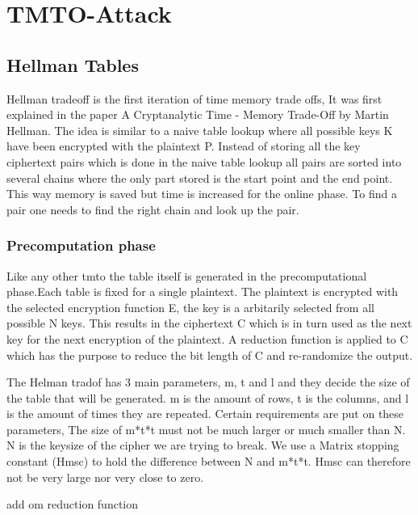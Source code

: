 \chapter{TMTO-Attack}

\label{ch:tmto}

\newpage
\section{Hellman Tables}
\label{sec:hmtheory}
Hellman tradeoff is the first iteration of time memory trade offs, It was first explained in the paper A Cryptanalytic Time - Memory Trade-Off by Martin Hellman.
The idea is similar to a naive table lookup where all possible keys K have been encrypted with the plaintext P. Instead of storing all the key ciphertext pairs which is done in the naive table lookup all pairs are sorted into several chains where the only part stored is the start point and the end point. This way memory is saved but time is increased for the online phase. To find a pair one needs to find the right chain and look up the pair.


\subsection*{Precomputation phase} %
Like any other tmto the table itself is generated in the precomputational phase.Each table is fixed for a single plaintext. The plaintext is encrypted with the selected encryption function E, the key is a arbitarily selected from all possible N keys. This results in the ciphertext C which is in turn used as the next key for the next encryption of the plaintext. A reduction function is applied to C which has the purpose to reduce the bit length of C and re-randomize the output.

The Helman tradof has 3 main parameters, m, t and l and they decide the size of the table that will be generated.
m is the amount of rows, t is the columns, and l is the amount of times they are repeated.
Certain requirements are put on these parameters, The size of m*t*t must not be much larger or much smaller than N.
N is the keysize of the cipher we are trying to break. We use a Matrix stopping constant (Hmsc) to hold the difference between N and m*t*t. Hmsc can therefore not be very large nor very close to zero.

add om reduction function

